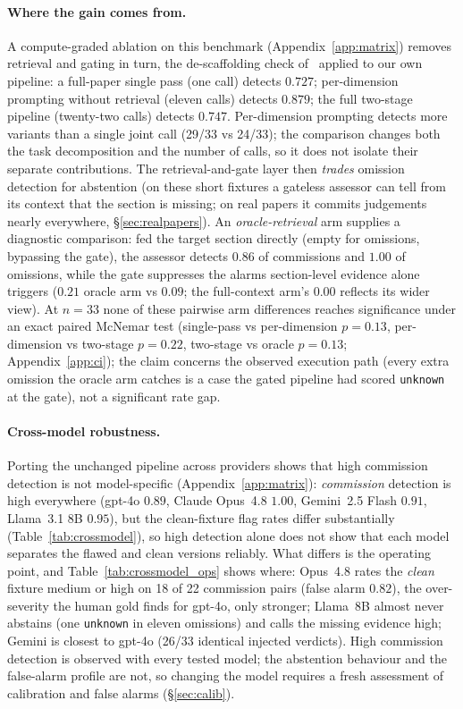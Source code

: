 \paragraph{Where the gain comes from.}
A compute-graded ablation on this benchmark (Appendix~\ref{app:matrix})
removes retrieval and gating in turn, the de-scaffolding check
of~\citet{dmconfound} applied to our own pipeline: a full-paper single pass
(one call) detects $0.727$; per-dimension prompting without retrieval (eleven
calls) detects $0.879$; the full two-stage pipeline (twenty-two calls) detects
$0.747$. Per-dimension prompting detects more variants than a single joint
call (29/33 vs 24/33); the comparison changes both the task decomposition and
the number of calls, so it does not isolate their separate contributions. The
retrieval-and-gate layer then \emph{trades} omission detection for abstention
(on these short fixtures a gateless assessor can tell from its context that
the section is missing; on real papers it commits judgements nearly everywhere,
\S\ref{sec:realpapers}). An \emph{oracle-retrieval} arm supplies
a diagnostic comparison: fed the target section directly (empty for omissions,
bypassing the gate), the assessor detects $0.86$ of commissions and $1.00$ of
omissions, while the gate suppresses the alarms section-level evidence alone
triggers ($0.21$ oracle arm vs $0.09$; the full-context arm's $0.00$ reflects
its wider view). At $n{=}33$ none of these pairwise arm differences reaches
significance under an exact paired McNemar test (single-pass vs per-dimension
$p{=}0.13$, per-dimension vs two-stage $p{=}0.22$, two-stage vs oracle
$p{=}0.13$; Appendix~\ref{app:ci}); the claim concerns the observed execution
path (every extra omission the oracle arm catches is a case the gated pipeline
had scored \texttt{unknown} at the gate), not a significant rate gap.

\paragraph{Cross-model robustness.}
Porting the unchanged pipeline across providers shows that high commission
detection is not model-specific (Appendix~\ref{app:matrix}): \emph{commission} detection is high
everywhere (gpt-4o $0.89$, Claude Opus~4.8 $1.00$, Gemini~2.5 Flash $0.91$,
Llama~3.1 8B $0.95$), but the clean-fixture flag rates differ substantially
(Table~\ref{tab:crossmodel}), so high detection alone does not show that each
model separates the flawed and clean versions reliably. What differs is the
operating point, and Table~\ref{tab:crossmodel_ops} shows where: Opus~4.8
rates the \emph{clean} fixture medium or high on 18 of 22 commission pairs
(false alarm $0.82$), the over-severity the human gold finds for gpt-4o, only
stronger; Llama~8B almost never abstains (one \texttt{unknown} in eleven
omissions) and calls the missing evidence high; Gemini is closest to gpt-4o
(26/33 identical injected verdicts). High commission detection is observed
with every tested model; the abstention behaviour and the false-alarm profile
are not, so changing the model requires a fresh assessment of calibration and
false alarms (\S\ref{sec:calib}).

